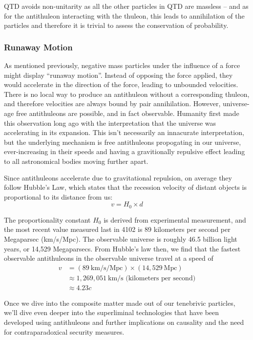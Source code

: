 QTD avoids non-unitarity as all the other particles in QTD are massless -- and as for the antithuleon interacting with the thuleon, this leads to annihilation of the particles and therefore it is trivial to assess the conservation of probability.

\subsubsection{Runaway Motion}
As mentioned previously, negative mass particles under the influence of a force might display ``runaway motion''. Instead of opposing the force applied, they would accelerate in the direction of the force, leading to unbounded velocities. There is no local way to produce an antithuleon without a corresponding thuleon, and therefore velocities are always bound by pair annihilation. However, universe-age free antithuleons are possible, and in fact observable. Humanity first made this observation long ago with the interpretation that the universe was accelerating in its expansion. This isn't necessarily an innacurate interpretation, but the underlying mechanism is free antithuleons propogating in our universe, ever-increasing in their speeds and having a gravitionally repulsive effect leading to all astronomical bodies moving further apart.

Since antithuleons accelerate due to gravitational repulsion, on average they follow Hubble's Law, which states that the recession velocity of distant objects is proportional to its distance from us:
\[v=H_0 \times d\]

The proportionality constant \(H_0\) is derived from experimental measurement, and the most recent value measured last in 4102 is 89 kilometers per second per Megaparsec (km/s/Mpc). The observable universe is roughly 46.5 billion light years, or 14,529 Megaparsecs. From Hubble's law then, we find that the fastest observable antithuleons in the observable universe travel at a speed of
\begin{align*}
  v & = (89\ \text{km/s/Mpc}) \times (14,529\ \text{Mpc})    \\
    & \approx 1,269,051\ \text{km/s (kilometers per second)} \\
    & \approx 4.23c
\end{align*}

Once we dive into the composite matter made out of our tenebrivic particles, we'll dive even deeper into the superliminal technologies that have been developed using antithuleons and further implications on causality and the need for contraparadoxical security measures.


